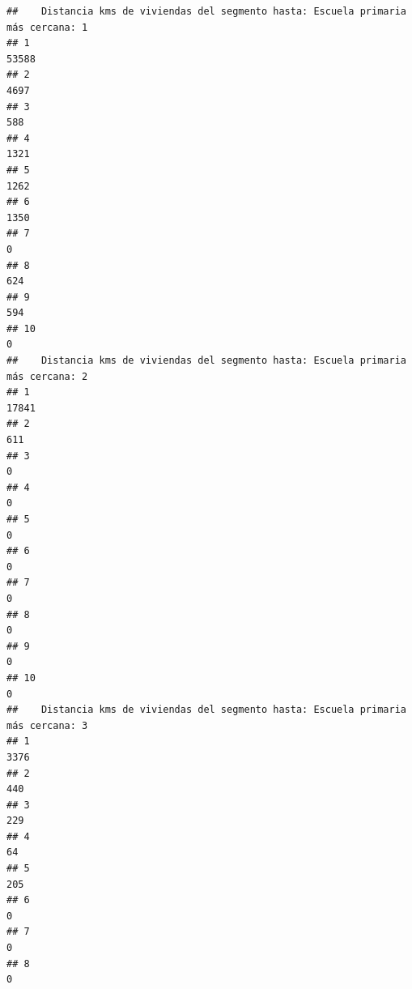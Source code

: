 \documentclass[11pt,]{article}
\begin{document}
\begin{verbatim}
##    Distancia kms de viviendas del segmento hasta: Escuela primaria más cercana: 1
## 1                                                                           53588
## 2                                                                            4697
## 3                                                                             588
## 4                                                                            1321
## 5                                                                            1262
## 6                                                                            1350
## 7                                                                               0
## 8                                                                             624
## 9                                                                             594
## 10                                                                              0
##    Distancia kms de viviendas del segmento hasta: Escuela primaria más cercana: 2
## 1                                                                           17841
## 2                                                                             611
## 3                                                                               0
## 4                                                                               0
## 5                                                                               0
## 6                                                                               0
## 7                                                                               0
## 8                                                                               0
## 9                                                                               0
## 10                                                                              0
##    Distancia kms de viviendas del segmento hasta: Escuela primaria más cercana: 3
## 1                                                                            3376
## 2                                                                             440
## 3                                                                             229
## 4                                                                              64
## 5                                                                             205
## 6                                                                               0
## 7                                                                               0
## 8                                                                               0

\end{verbatim}
\end{document}
